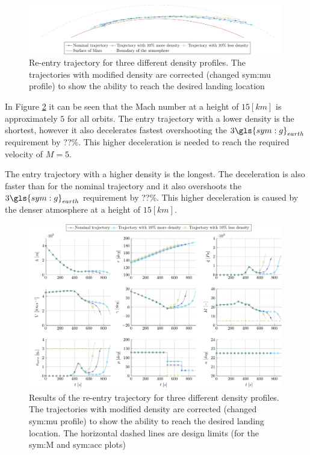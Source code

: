 \begin{figure}[ht]
	\centering
	\includegraphics[width=0.99\textwidth]{Figure/Orbit/entry_mars.pdf}
	\caption[Re-entry trajectory for three different density profiles]{Re-entry trajectory for three different density profiles. The trajectories with modified density are corrected (changed \gls{sym:mu} profile) to show the ability to reach the desired landing location}
	\label{fig:entry_mars}
\end{figure}

In Figure \ref{fig:orbit_entry_data} it can be seen that the Mach number at a height of $15 \left[km\right]$ is approximately $5$ for all orbits. The entry trajectory with a lower density is the shortest, however it also decelerates fastest overshooting the $3 \gls{sym:g}_{earth}$ requirement by ??\%. This higher deceleration is needed to reach the required velocity of $M=5$.

The entry trajectory with a higher density is the longest. The deceleration is also faster than for the nominal trajectory and it also overshoots the $3 \gls{sym:g}_{earth}$ requirement by ??\%. This higher deceleration is caused by the denser atmosphere at a height of $15 \left[km\right]$.

\begin{figure}
	\centering
	\includegraphics[width=0.99\textwidth]{Figure/Orbit/sensitivity_entry.pdf}
	\caption[Results of the re-entry trajectory for three different density profiles.]{Results of the re-entry trajectory for three different density profiles. The trajectories with modified density are corrected (changed \gls{sym:mu} profile) to show the ability to reach the desired landing location. The horizontal dashed lines are design limits (for the \gls{sym:M} and \gls{sym:acc} plots)}
	\label{fig:orbit_entry_data}
\end{figure}

